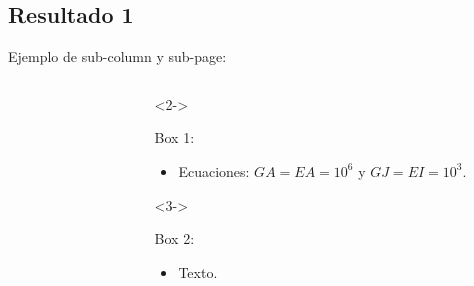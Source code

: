 \documentclass[
  aspectratio=169,
]{beamer}
\begin{document}
\begin{small}
\subsection[Resultado 1 Abv]{Resultado 1}
\begin{frame}[t]{Ejemplo de sub-column y sub-page:}
	\begin{columns}[T,onlytextwidth]
		\begin{column}{.58\textwidth}
			\begin{minipage}{\textwidth}
				\begin{figure}[htbp]
				\label{fig:RN:RA:Ilusxy}
				\label{fig:RN:RA:Ilusyz}
				\end{figure}
					\begin{figure}[htbp]
					
					\def\svgwidth{35mm}
					
				\end{figure}
		\end{minipage}  
		\end{column}
		\begin{column}{.4\textwidth}
			\begin{onlyenv}<2->
				\begin{minipage}{\textwidth}
					\vspace{-1cm}
					\begin{block}{Box 1:}
						\begin{itemize}
							\item Ecuaciones: $GA= EA=10^6$ y $GJ = EI =10^3$.  

						\end{itemize}	 
					\end{block}
				\end{minipage}
			\end{onlyenv}
			\begin{onlyenv}<3->
				\begin{minipage}{\textwidth}
					\begin{block}{Box 2:}
						\begin{itemize}
							\item Texto.
						\end{itemize}	 
					\end{block}
				\end{minipage}
			\end{onlyenv}
		\end{column}
	\end{columns}
\end{frame}





\end{small}
\end{document}
